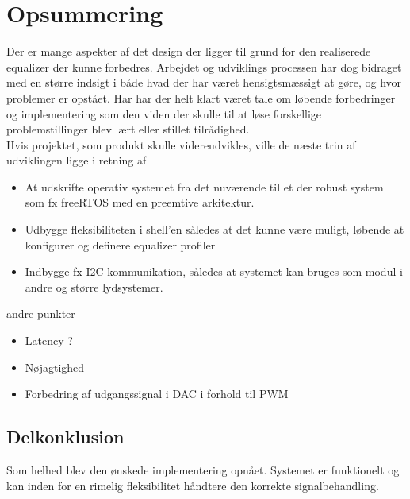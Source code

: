 \section{Opsummering}
Der er mange aspekter af det design der ligger til grund for den realiserede equalizer der kunne forbedres.
Arbejdet og udviklings processen har dog bidraget med en større indsigt i både hvad der har været hensigtsmæssigt at gøre, og hvor problemer er opstået.
Har har der helt klart været tale om løbende forbedringer og implementering som den viden der skulle til at løse forskellige problemstillinger blev lært eller stillet tilrådighed.\\

Hvis projektet, som produkt skulle videreudvikles, ville de næste trin af udviklingen ligge i retning af
\begin{itemize}
	\item At udskrifte operativ systemet fra det nuværende til et der robust system som fx freeRTOS med en preemtive arkitektur.
	\item Udbygge fleksibiliteten i shell'en således at det kunne være muligt, løbende at konfigurer og definere equalizer profiler
	\item Indbygge fx I2C kommunikation, således at systemet kan bruges som modul i andre og større lydsystemer.
\end{itemize} 

andre punkter
\begin{itemize}
	\item Latency ?
	\item Nøjagtighed
	\item Forbedring af udgangssignal i DAC i forhold til PWM
\end{itemize}

\subsection{Delkonklusion}
Som helhed blev den ønskede implementering opnået.
Systemet er funktionelt og kan inden for en rimelig fleksibilitet håndtere den korrekte signalbehandling.


